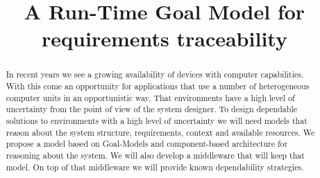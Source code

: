 \documentclass[mestrado]{pacotes/unb-cic}
\title{A Run-Time Goal Model for requirements traceability}
\begin{document}
\maketitle

\pretextual



\begin{abstract}\textbf{}

  In recent years we see a growing availability of devices with computer capabilities. With this come an opportunity for applications that use a number of heterogeneous computer units in an opportunistic way. That environments have a high level of uncertainty from the point of view of the system designer.
  To design dependable solutions to environments with a high level of uncertainty we will need models that reason about the system structure, requirements, context and available resources.
  We propose a model based on Goal-Models and component-based architecture for reasoning about the system. We will also develop a middleware that will keep that model. On top of that middleware we will provide known dependability strategies.




\end{abstract}
\end{document}
